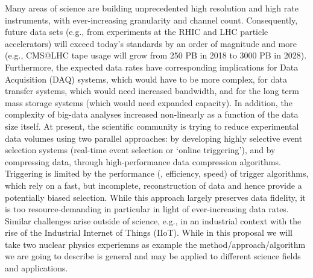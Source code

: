 Many areas of science are building unprecedented high resolution and high rate instruments, with ever-increasing granularity and channel count. Consequently,  future data sets  (e.g., from experiments at the RHIC and LHC particle accelerators) will exceed today's standards by an order of magnitude and more (e.g., CMS@LHC tape usage will grow from 250 PB in 2018 to 3000 PB in 2028). Furthermore, the expected data rates have corresponding implications for  Data Acquisition (DAQ) systems, which would have to be more complex, for data transfer systems, which would need increased bandwidth, and for the long term mass storage systems (which would need expanded capacity). In addition, the complexity of big-data analyses increased non-linearly as a function of the data size itself. At present, the scientific community is trying to reduce experimental data volumes using two parallel approaches: by developing highly selective event selection systems (\eg real-time event selection or `online triggering'), and by compressing data, through high-performance data compression algorithms. Triggering is limited by the performance (\ie, efficiency, speed) of trigger algorithms, which rely on a fast, but incomplete, reconstruction of data and hence provide a potentially biased selection. While this approach largely preserves data fidelity, it is too resource-demanding in particular in light of ever-increasing data rates. Similar challenges arise outside of science, e.g., in an industrial context with the rise of the Industrial Internet of Things (IIoT). While in this proposal we will take two nuclear physics experiemns as example the method/approach/algorithm we are going to describe is general and may be applied to different science fields and applications. 

